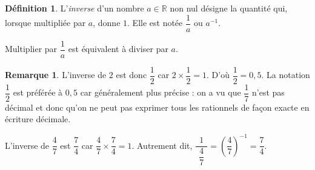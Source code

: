 \documentclass[a4paper, 14pt]{extarticle}
\theoremstyle{plain}
\theoremstyle{definition}
\newtheorem{definition}{Définition}
\newtheorem{remark}{Remarque}
\newcommand{\R}{\mathbb{R}}
\begin{document}
\begin{definition}
	L'\emph{inverse} d'un nombre $a \in \R$ non nul désigne la quantité qui, lorsque multipliée par $a$, donne $1$.
	Elle est notée $\dfrac{1}{a}$ ou $a^{-1}$.
	
	Multiplier par $\dfrac1a$ est équivalent à diviser par $a$.
\end{definition}

\begin{remark}
	L'inverse de $2$ est donc $\dfrac12$ car $2 \times \dfrac12 = 1$. D'où $\dfrac12 = 0{,}5$.
	La notation $\dfrac12$ est préférée à $0{,}5$ car généralement plus précise : on a vu que $\dfrac17$ n'est pas décimal et donc qu'on ne peut pas exprimer tous les rationnels de façon exacte en écriture décimale.
	
	L'inverse de $\dfrac47$ est $\dfrac74$ car $\dfrac47 \times \dfrac74 = 1$.
	Autrement dit, $\dfrac{\ \ 1 \ \ }{\dfrac47} = \left( \dfrac47 \right)^{-1} = \dfrac74$.
\end{remark}
\end{document}
